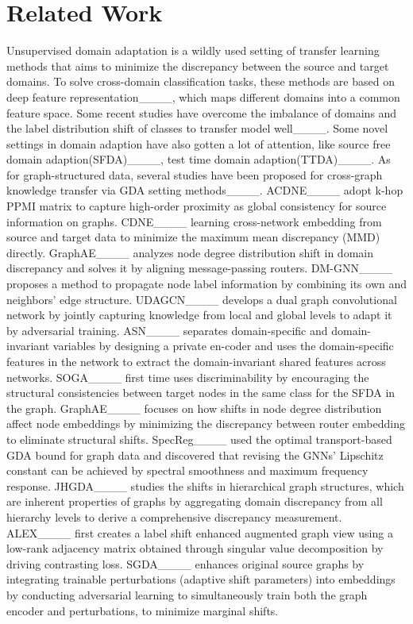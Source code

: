 \section{Related Work}
Unsupervised domain adaptation is a wildly used setting of transfer learning methods that aims to minimize the discrepancy between the source and target domains. To solve cross-domain classification tasks, these methods are based on deep feature representation____, which maps different domains into a common feature space. Some recent studies have overcome the imbalance of domains and the label distribution shift of classes to transfer model well____. Some novel settings in domain adaption have also gotten a lot of attention, like source free domain adaption(SFDA)____, test time domain adaption(TTDA)____.
As for graph-structured data, several studies have been proposed for cross-graph knowledge transfer via GDA setting methods____. ACDNE____ adopt k-hop PPMI matrix to capture high-order proximity as global consistency for source information on graphs. CDNE____ learning cross-network embedding from source and target data to minimize the maximum mean discrepancy (MMD) directly. GraphAE____ analyzes node degree distribution shift in domain discrepancy and solves it by aligning message-passing routers. DM-GNN____ proposes a method to propagate node label information by combining its own and neighbors’ edge structure. 
UDAGCN____ develops a dual graph convolutional network by jointly capturing knowledge from local and global levels to adapt it by adversarial training. ASN____ separates domain-specific and domain-invariant variables by designing a private en-coder and uses the domain-specific features in the network to extract the domain-invariant shared features across networks.  SOGA____ first time uses discriminability by encouraging the structural consistencies between target nodes in the same class for the SFDA in the graph. GraphAE____ focuses on how shifts in node degree distribution affect node embeddings by minimizing the discrepancy between router embedding to eliminate structural shifts.
SpecReg____ used the optimal transport-based GDA bound for graph data and discovered that revising the GNNs’ Lipschitz constant can be achieved by spectral smoothness and maximum frequency response.  JHGDA____ studies the shifts in hierarchical graph structures, which are inherent properties of graphs by aggregating domain discrepancy from all hierarchy levels to derive a comprehensive discrepancy measurement. ALEX____ first creates a label shift enhanced augmented graph view using a low-rank adjacency matrix obtained through singular value decomposition by driving contrasting loss. SGDA____ enhances original source graphs by integrating trainable perturbations (adaptive shift parameters) into embeddings by conducting adversarial learning to simultaneously train both the graph encoder and perturbations, to minimize marginal shifts.